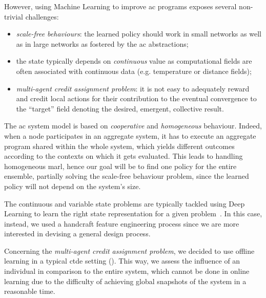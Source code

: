
However, using Machine Learning to improve \ac{ac} programs exposes several non-trivial challenges:
\begin{itemize}
  \item \emph{scale-free behaviours}: the learned policy should work in small networks as well as in large networks as fostered by the \ac{ac} abstractions;
  \item the state typically depends on \emph{continuous} value as computational fields are often associated with continuous data (e.g. temperature or distance fields);
  \item \emph{multi-agent credit assignment problem}: 
   it is not easy to adequately reward and credit local actions for their contribution to the eventual convergence to
   the ``target'' field denoting the desired, emergent, collective result.
\end{itemize}
%
The \ac{ac} system model is based on \emph{cooperative} and \emph{homogeneous} behaviour. 
%
Indeed, when a node participates in an aggregate system, it has to execute an aggregate program shared within the whole system, which yields different outcomes according to the contexts on which it gets evaluated. 
%
This leads to handling homogeneous \ac{marl}, hence our goal will be to find one policy for the entire ensemble, partially solving the scale-free behaviour problem, since the learned policy will not depend on the system's size.

The continuous and variable state problems are typically tackled using Deep Learning to learn the right state representation for a given problem~\cite{DBLP:journals/corr/abs-1806-08894}. %
%
In this case, instead, we used a handcraft feature engineering process since we are more interested in devising a general design process.

Concerning the \emph{multi-agent credit assignment problem}, we decided to use offline learning 
in a typical \ac{ctde} setting ().
%
This way, we assess the influence of an individual in comparison to the entire system, which cannot be done in online learning due to the difficulty of achieving global snapshots of the system in a reasonable time.


